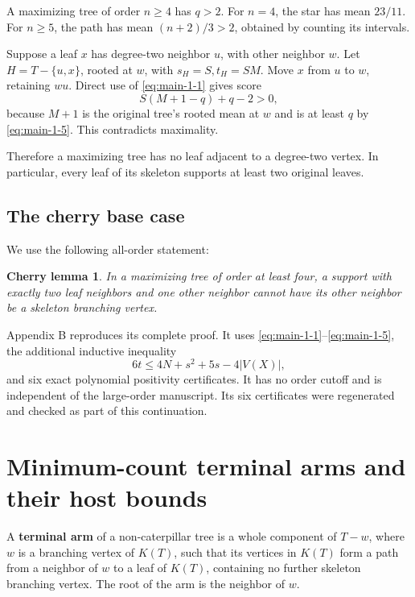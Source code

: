 \documentclass[11pt,letterpaper]{article}
\theoremstyle{plain}
\newtheorem*{cherrylemma}{Cherry lemma}
\begin{document}
A maximizing tree of order \(n\ge4\) has \(q>2\). For \(n=4\), the star has mean \(23/11\). For \(n\ge5\), the path has mean \((n+2)/3>2\), obtained by counting its intervals.

Suppose a leaf \(x\) has degree-two neighbor \(u\), with other neighbor \(w\). Let \(H=T-\{u,x\}\), rooted at \(w\), with \(s_H=S,t_H=SM\). Move \(x\) from \(u\) to \(w\), retaining \(wu\). Direct use of \eqref{eq:main-1-1} gives score \[
S(M+1-q)+q-2>0,
\tag{1.7}\label{eq:main-1-7}
\] because \(M+1\) is the original tree's rooted mean at \(w\) and is at least \(q\) by \eqref{eq:main-1-5}. This contradicts maximality.

Therefore a maximizing tree has no leaf adjacent to a degree-two vertex. In particular, every leaf of its skeleton supports at least two original leaves.

\subsection{The cherry base case}\label{the-cherry-base-case}

We use the following all-order statement:

\begin{cherrylemma}\label{lem:cherry} In a maximizing tree of order at least four, a support with exactly two leaf neighbors and one other neighbor cannot have its other neighbor be a skeleton branching vertex.
\end{cherrylemma}

Appendix B reproduces its complete proof. It uses \eqref{eq:main-1-1}--\eqref{eq:main-1-5}, the additional inductive inequality \[
6t\le4N+s^2+5s-4|V(X)|,
\tag{1.8}\label{eq:main-1-8}
\] and six exact polynomial positivity certificates. It has no order cutoff and is independent of the large-order manuscript. Its six certificates were regenerated and checked as part of this continuation.

\section{Minimum-count terminal arms and their host bounds}\label{minimum-count-terminal-arms-and-their-host-bounds}

A \textbf{terminal arm} of a non-caterpillar tree is a whole component of \(T-w\), where \(w\) is a branching vertex of \(K(T)\), such that its vertices in \(K(T)\) form a path from a neighbor of \(w\) to a leaf of \(K(T)\), containing no further skeleton branching vertex. The root of the arm is the neighbor of \(w\).
\end{document}
